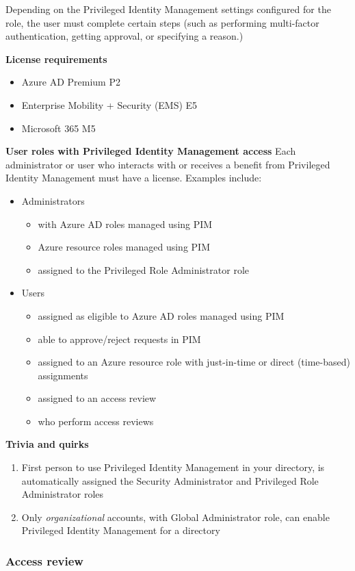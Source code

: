 Depending on the Privileged Identity Management settings configured for the role, the user must complete certain steps (such as performing multi-factor authentication, getting approval, or specifying a reason.)

\textbf{License requirements}
\begin{itemize}
\item Azure AD Premium P2
\item Enterprise Mobility + Security (EMS) E5
\item Microsoft 365 M5
\end{itemize}

\textbf{User roles with Privileged Identity Management access}
Each administrator or user who interacts with or receives a benefit from Privileged Identity Management must have a license. Examples include:
\begin{itemize}
\item Administrators
	\begin{itemize}
	\item with Azure AD roles managed using PIM
	\item Azure resource roles managed using PIM
	\item assigned to the Privileged Role Administrator role
	\end{itemize}
\item Users
	\begin{itemize}
	\item assigned as eligible to Azure AD roles managed using PIM
	\item able to approve/reject requests in PIM
	\item assigned to an Azure resource role with just-in-time or direct (time-based) assignments
	\item assigned to an access review
	\item who perform access reviews
	\end{itemize}
\end{itemize}

\textbf{Trivia and quirks} 
\begin{enumerate}
\item First person to use Privileged Identity Management in your directory, is automatically assigned the Security Administrator and Privileged Role Administrator roles
\item Only \textit{organizational} accounts, with Global Administrator role, can enable Privileged Identity Management for a directory
\end{enumerate}

\subsubsection{Access review}
